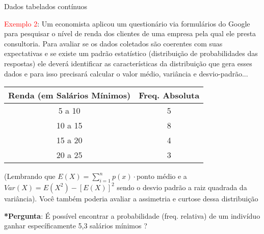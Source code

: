 \documentclass{beamer}
\begin{document}
\begin{frame}{Dados tabelados contínuos}

\footnotesize
\vspace{-.5cm}
\textcolor{red}{Exemplo 2}: Um economista aplicou um questionário via formulários do Google para pesquisar o nível de renda dos clientes de uma empresa pela qual ele presta consultoria. Para avaliar se os dados coletados são coerentes com suas expectativas e se existe um padrão estatístico (distribuição de probabilidades das respostas) ele deverá identificar as características da distribuição que gera esses dados e para isso precisará calcular o valor médio, variância e desvio-padrão...

\begin{table}[htbp]
  \centering
    \begin{tabular}{cc}
    \toprule
    \hline
    \multicolumn{1}{l}{\textbf{Renda (em Salários Mínimos)}} & \textbf{Freq. Absoluta} \\
    \hline
    \midrule
    5 a 10  & 5 \\
    10 a 15 & 8 \\
    15 a 20 & 4 \\
    20 a 25 & 3 \\
    \bottomrule
    \hline
    \end{tabular}%
  \label{tab:addlabel}%
\end{table}%

(Lembrando que $E(X)=\sum^{n}_{i=1}p(x)\cdot\mbox{ponto médio}$ e a $Var(X)=E(X^2)-[E(X)]^2$ sendo o desvio padrão a raiz quadrada da variância). Você também poderia avaliar a assimetria e curtose dessa distribuição


\textbf{*Pergunta}: É possível encontrar a probabilidade (freq. relativa) de um indivíduo ganhar específicamente 5,3 salários mínimos ?

\end{frame}
\end{document}
